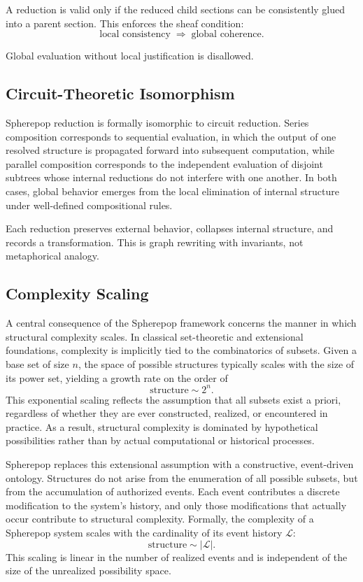 \documentclass[11pt]{article}
\begin{document}
A reduction is valid only if the reduced child sections can be consistently glued into a parent section. This enforces the sheaf condition:
\[
\text{local consistency} \;\Rightarrow\; \text{global coherence}.
\]

Global evaluation without local justification is disallowed.

\subsection{Circuit-Theoretic Isomorphism}

Spherepop reduction is formally isomorphic to circuit reduction. Series composition corresponds to sequential evaluation, in which the output of one resolved structure is propagated forward into subsequent computation, while parallel composition corresponds to the independent evaluation of disjoint subtrees whose internal reductions do not interfere with one another. In both cases, global behavior emerges from the local elimination of internal structure under well-defined compositional rules.

Each reduction preserves external behavior, collapses internal structure, and records a transformation. This is graph rewriting with invariants, not metaphorical analogy.

\subsection{Complexity Scaling}

A central consequence of the Spherepop framework concerns the manner in which structural complexity scales. In classical set-theoretic and extensional foundations, complexity is implicitly tied to the combinatorics of subsets. Given a base set of size $n$, the space of possible structures typically scales with the size of its power set, yielding a growth rate on the order of
\[
\text{structure} \sim 2^n.
\]
This exponential scaling reflects the assumption that all subsets exist a priori, regardless of whether they are ever constructed, realized, or encountered in practice. As a result, structural complexity is dominated by hypothetical possibilities rather than by actual computational or historical processes.

Spherepop replaces this extensional assumption with a constructive, event-driven ontology. Structures do not arise from the enumeration of all possible subsets, but from the accumulation of authorized events. Each event contributes a discrete modification to the system’s history, and only those modifications that actually occur contribute to structural complexity. Formally, the complexity of a Spherepop system scales with the cardinality of its event history $\mathcal{L}$:
\[
\text{structure} \sim |\mathcal{L}|.
\]
This scaling is linear in the number of realized events and is independent of the size of the unrealized possibility space.
\end{document}
